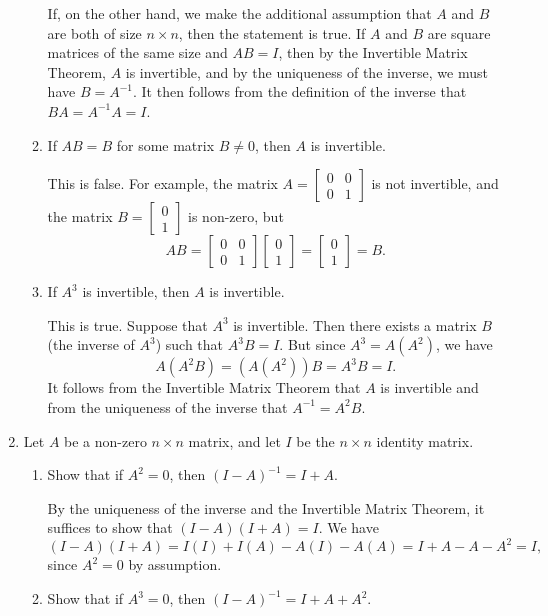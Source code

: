 \documentclass[letterpaper,12pt]{article}
\newcommand{\bbm}{\begin{bmatrix}}
\newcommand{\ebm}{\end{bmatrix}}
\begin{document}
\begin{enumerate}
\begin{enumerate}
If, on the other hand, we make the additional assumption that $A$ and $B$ are both of size $n\times n$, then the statement is true. If $A$ and $B$ are square matrices of the same size and $AB=I$, then by the Invertible Matrix Theorem, $A$ is invertible, and by the uniqueness of the inverse, we must have $B=A^{-1}$. It then follows from the definition of the inverse that $BA = A^{-1}A = I$.

\medskip

 \item If $AB=B$ for some matrix $B\neq 0$, then $A$ is invertible. 

\medskip

This is false. For example, the matrix $A=\bbm 0&0\\0&1\ebm$ is not invertible, and the matrix $B=\bbm 0\\1\ebm$ is non-zero, but
\[
 AB = \bbm 0&0\\0&1\ebm\bbm 0\\1\ebm = \bbm 0\\1\ebm = B.
\]

\medskip

 \item If $A^3$ is invertible, then $A$ is invertible.

\medskip

This is true. Suppose that $A^3$ is invertible. Then there exists a matrix $B$ (the inverse of $A^3$) such that $A^3B = I$. But since $A^3=A(A^2)$, we have
\[
 A(A^2B) = (A(A^2))B = A^3B = I.
\]
It follows from the Invertible Matrix Theorem that $A$ is invertible and from the uniqueness of the inverse that $A^{-1} = A^2B$.
\end{enumerate}

\bigskip


\item Let $A$ be a non-zero $n\times n$ matrix, and let $I$ be the $n\times n$ identity matrix.
\begin{enumerate}
 \item Show that if $A^2=0$, then $(I-A)^{-1} = I+A$.

\medskip

By the uniqueness of the inverse and the Invertible Matrix Theorem, it suffices to show that $(I-A)(I+A) = I$. We have
\[
 (I-A)(I+A) = I(I)+I(A)-A(I)-A(A) = I+A-A-A^2 = I,
\]
since $A^2=0$ by assumption.

\medskip

 \item Show that if $A^3=0$, then $(I-A)^{-1} = I+A+A^2$.


\end{enumerate}
\end{enumerate}
\end{document}
